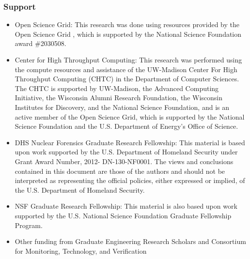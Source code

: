 \begin{frame}
  \frametitle{Support}
  \begin{adjustwidth}{-15pt}{0pt}
  \begin{itemize}
    \small
    
    \item Open Science Grid: {\tiny This research was done using
    resources provided by the Open Science Grid \cite{osg07, osg09}, which is
    supported by the National Science Foundation award \#2030508.}
    
    \item Center for High Throughput Computing: {\tiny This research was
    performed using the compute resources and assistance of the UW-Madison
    Center For High Throughput Computing (CHTC) in the Department of Computer
    Sciences. The CHTC is supported by UW-Madison, the Advanced Computing
    Initiative, the Wisconsin Alumni Research Foundation, the Wisconsin
    Institutes for Discovery, and the National Science Foundation, and is an
    active member of the Open Science Grid, which is supported by the National
    Science Foundation and the U.S. Department of Energy's Office of Science.}
    
    \item DHS Nuclear Forensics Graduate Research Fellowship: {\tiny This
    material is based upon work supported by the U.S. Department of Homeland
    Security under Grant Award Number, 2012- DN-130-NF0001. The views and
    conclusions contained in this document are those of the authors and should
    not be interpreted as representing the official policies, either expressed
    or implied, of the U.S. Department of Homeland Security.}
    
    \item NSF Graduate Research Fellowship: {\tiny This material is also
    based upon work supported by the U.S. National Science Foundation Graduate
    Fellowship Program.}
    
    \item Other funding from Graduate Engineering Research Scholars and
    Consortium for Monitoring, Technology, and Verification
  
  \end{itemize}
  \end{adjustwidth}
\end{frame}

